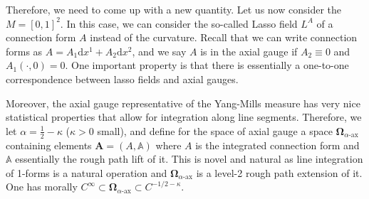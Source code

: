 \documentclass[12pt]{article}
\numberwithin{equation}{section}
\theoremstyle{definition}
\theoremstyle{remark}
\newcommand{\dif}{\,\mathrm{d}}
\newcommand{\diff}{\mathrm{d}}
\newcommand{\1}{\mathbf 1}
\newcommand{\<}{\langle}
\renewcommand{\>}{\rangle}
\newcommand{\ax}{\text{-}\mathrm{ax}}
\newcommand{\bfA}{\mathbf A}
\newcommand{\bA}{\mathbb A}
\newcommand{\bfOmega}{\boldsymbol{\Omega}}
\begin{document}
Therefore, we need to come up with a new quantity. Let us now consider the $M=[0,1]^2$. In this case, we can consider the so-called Lasso field $L^A$ of a connection form $A$ instead of the curvature. Recall that we can write connection forms as $A=A_1\diff x^1+A_2\diff x^2$, and we say $A$ is in the axial gauge if $A_2\equiv 0$ and $A_1(\cdot,0)=0$. One important property is that there is essentially a one-to-one correspondence between lasso fields and axial gauges. 

Moreover, the axial gauge representative of the Yang-Mills measure has very nice statistical properties that allow for integration along line segments. Therefore, we let $\alpha=\frac 1 2-\kappa$ ($\kappa>0$ small), and define for the space of axial gauge a space $\bfOmega_{\alpha\ax}$ containing elements $\bfA=(A,\bA)$ where $A$ is the integrated connection form and $\bA$ essentially the rough path lift of it. 
%
%
%
This is novel and natural as line integration of 1-forms is a natural operation and $\bfOmega_{\alpha\ax}$ is a level-2 rough path extension of it. 
%
One has morally $C^\infty\subset \bfOmega_{\alpha\ax}\subset C^{-1/2-\kappa}$.

\end{document}
